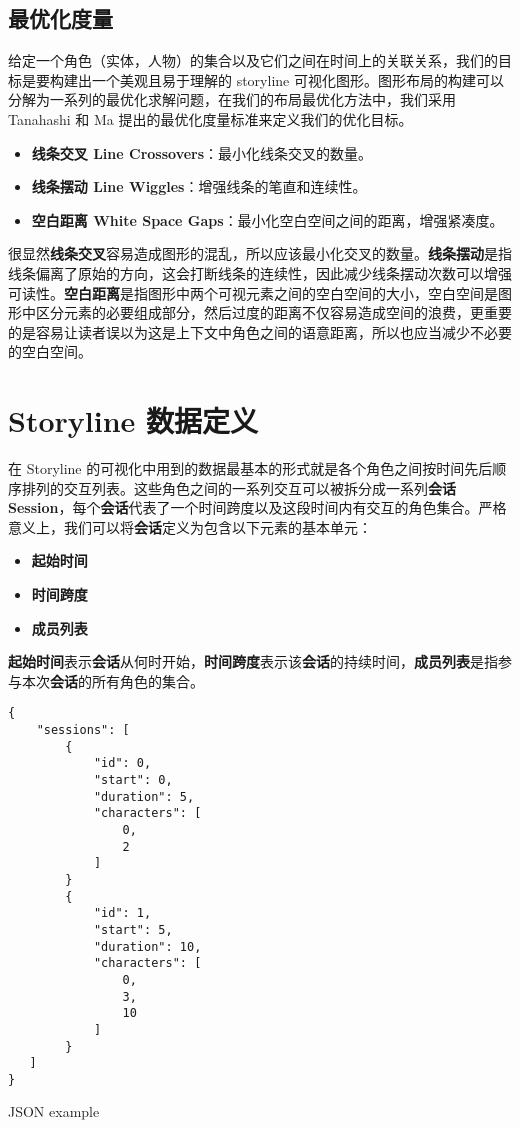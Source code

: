 \subsection{最优化度量}
\label{metrics}
给定一个角色（实体，人物）的集合以及它们之间在时间上的关联关系，我们的目标是要构建出一个美观且易于理解的 storyline 可视化图形。图形布局的构建可以分解为一系列的最优化求解问题，在我们的布局最优化方法中，我们采用 Tanahashi 和 Ma \cite{tanahashi2012design} 提出的最优化度量标准来定义我们的优化目标。
\begin{itemize}
\item \textbf{线条交叉 Line Crossovers}：最小化线条交叉的数量。
\item \textbf{线条摆动 Line Wiggles}：增强线条的笔直和连续性。
\item \textbf{空白距离 White Space Gaps}：最小化空白空间之间的距离，增强紧凑度。
\end{itemize}
很显然\textbf{线条交叉}容易造成图形的混乱，所以应该最小化交叉的数量。\textbf{线条摆动}是指线条偏离了原始的方向，这会打断线条的连续性，因此减少线条摆动次数可以增强可读性。\textbf{空白距离}是指图形中两个可视元素之间的空白空间的大小，空白空间是图形中区分元素的必要组成部分，然后过度的距离不仅容易造成空间的浪费，更重要的是容易让读者误以为这是上下文中角色之间的语意距离，所以也应当减少不必要的空白空间。

\section{Storyline 数据定义}
在 Storyline 的可视化中用到的数据最基本的形式就是各个角色之间按时间先后顺序排列的交互列表。这些角色之间的一系列交互可以被拆分成一系列\textbf{会话 Session}，每个\textbf{会话}代表了一个时间跨度以及这段时间内有交互的角色集合。严格意义上，我们可以将\textbf{会话}定义为包含以下元素的基本单元：
\begin{itemize}
\item \textbf{起始时间}
\item \textbf{时间跨度}
\item \textbf{成员列表}
\end{itemize}
\textbf{起始时间}表示\textbf{会话}从何时开始，\textbf{时间跨度}表示该\textbf{会话}的持续时间，\textbf{成员列表}是指参与本次\textbf{会话}的所有角色的集合。

\begin{listing}
\begin{verbatim}
{
    "sessions": [
        {
            "id": 0,
            "start": 0,
            "duration": 5,
            "characters": [
                0,
                2
            ]
        }
        {
            "id": 1,
            "start": 5,
            "duration": 10,
            "characters": [
                0,
                3,
                10
            ]
        }
   ]
}
\end{verbatim}
\caption{JSON example} 
\label{json-example}
\end{listing}

